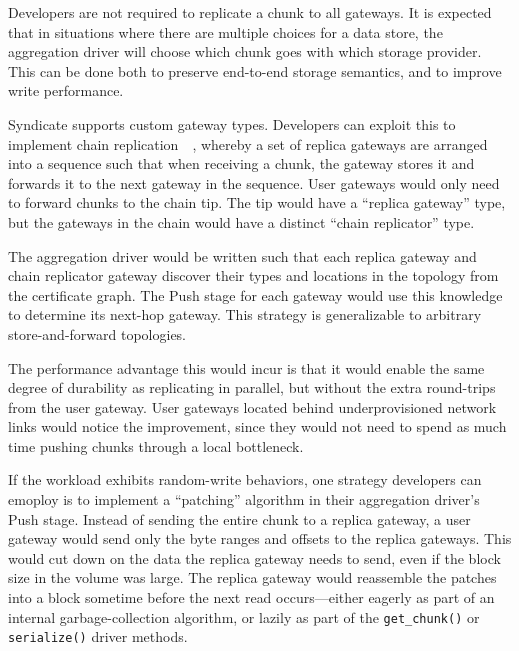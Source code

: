 \hfill \break
{}
\hfill \break

Developers are not required to replicate a chunk to all gateways.  It is
expected that in situations where there are multiple choices for a data store,
the aggregation driver will choose which chunk goes with which storage provider.
This can be done both to preserve end-to-end storage semantics, and to improve
write performance.

\hfill \break
{}
\hfill \break

Syndicate supports custom gateway types.  Developers can exploit this
to implement chain replication~\cite{chain-replication}~\cite{craq}, whereby a set of 
replica gateways are arranged into a sequence such that when receiving a chunk,
the gateway stores it and forwards it to the next gateway in the sequence.
User gateways would only need to forward chunks to the chain tip.  The tip would
have a ``replica gateway'' type, but the gateways in the chain would have a
distinct ``chain replicator'' type.

The aggregation driver would be written
such that each replica gateway and chain replicator gateway discover their
types and locations in the topology from the certificate graph.  The Push stage
for each gateway would use this knowledge to determine its next-hop gateway.
This strategy is generalizable to arbitrary store-and-forward topologies.

The performance advantage this would incur is that it would enable the same
degree of durability as replicating in parallel, but without the extra
round-trips from the user gateway.  User gateways located behind
underprovisioned network links would notice the improvement, since they would
not need to spend as much time pushing chunks through a local bottleneck.

\hfill \break
{}
\hfill \break

If the workload exhibits random-write behaviors, one strategy developers can
emoploy is to implement a ``patching'' algorithm in their aggregation driver's
Push stage.  Instead of sending the entire chunk to a replica gateway, a user
gateway would send only the byte ranges and offsets to the replica gateways.
This would cut down on the data the replica gateway needs to send, even if the
block size in the volume was large.
The replica gateway would reassemble the patches into a block sometime before
the next read occurs---either eagerly as part of an internal
garbage-collection algorithm, or lazily as part of the \texttt{get\_chunk()} or
\texttt{serialize()} driver methods.

